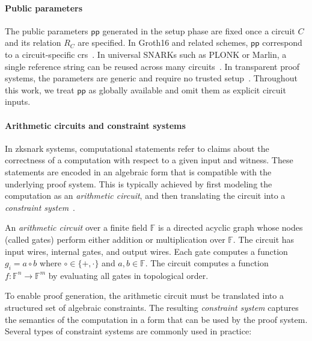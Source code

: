 \paragraph{Public parameters}
The public parameters $\mathsf{pp}$ generated in the setup phase are fixed once a circuit $C$ and its relation $R_C$ are specified. In Groth16 and related schemes, $\mathsf{pp}$ correspond to a circuit-specific \acrfull{crs}~\cite{groth2016size}. In universal SNARKs such as PLONK or Marlin, a single reference string can be reused across many circuits~\cite{cryptoeprint:2019/953,cryptoeprint:2019/1047}. In transparent proof systems, the parameters are generic and require no trusted setup~\cite{cryptoeprint:2018/046}. Throughout this work, we treat $\mathsf{pp}$ as globally available and omit them as explicit circuit inputs.

\paragraph{Arithmetic circuits and constraint systems}
In \acrshort{zksnark} systems, computational statements refer to claims about the correctness of a computation with respect to a given input and witness. These statements are encoded in an algebraic form that is compatible with the underlying proof system. This is typically achieved by first modeling the computation as an \textit{arithmetic circuit}, and then translating the circuit into a \textit{constraint system}~\cite{groth2016size, boneh2020moderncrypto}.

\begin{definition}
	An \textit{arithmetic circuit} over a finite field $\mathbb{F}$ is a directed acyclic graph whose nodes (called gates) perform either addition or multiplication over $\mathbb{F}$. The circuit has input wires, internal gates, and output wires. Each gate computes a function $g_i = a \circ b$ where $\circ \in \{+, \cdot\}$ and $a, b \in \mathbb{F}$. The circuit computes a function $f: \mathbb{F}^n \rightarrow \mathbb{F}^m$ by evaluating all gates in topological order.
\end{definition}

To enable proof generation, the arithmetic circuit must be translated into a structured set of algebraic constraints. The resulting \textit{constraint system} captures the semantics of the computation in a form that can be used by the proof system. Several types of constraint systems are commonly used in practice:

